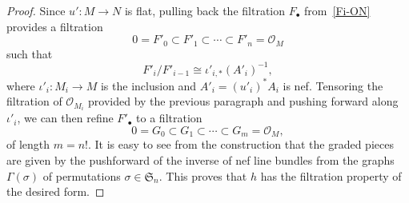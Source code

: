 \documentclass[11pt, reqno]{amsart}
\numberwithin{equation}{section}
\theoremstyle{plain}
\theoremstyle{remark}
\theoremstyle{definition}
\theoremstyle{italicsname}
\newcommand{\cO}{\mathcal{O}}
\newcommand{\fS}{\mathfrak{S}}
\begin{document}
\begin{proof}
Since $u' \colon M \to N$ is flat, pulling back the filtration $F_{\bullet}$ from~\eqref{Fi-ON} provides a filtration 
\begin{equation*}
0 = F'_0 \subset F'_1 \subset \cdots \subset F'_n = \cO_M 
\end{equation*} 
such that 
\begin{equation*}
    F'_{i}/F'_{i-1} \cong \iota'_{i,*} (A'_i)^{-1},
\end{equation*}
where $\iota'_i \colon M_i \to M$ is the inclusion and $A'_i = (u'_i)^*A_i$ is nef. 
Tensoring the filtration of $\cO_{M_i}$ provided by the previous paragraph and pushing forward along $\iota'_i$, we can then refine $F'_{\bullet}$ to a filtration 
\begin{equation*}
    0 = G_0 \subset G_1 \subset \cdots \subset G_{m} = \cO_{M}, 
\end{equation*}
of length $m = n!$. 
It is easy to see from the construction that the graded pieces are given by the pushforward of the inverse of nef line bundles from the graphs $\Gamma(\sigma)$ of permutations $\sigma \in \fS_{n}$. 
This proves that $h$ has the filtration property of the desired form.
\end{proof}



\end{document}
